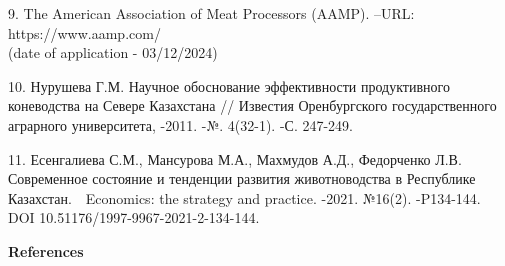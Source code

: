 \begin{noparindent}
9. The American Association of Meat Processors (AAMP). --URL:
https://www.aamp.com/ \\(date of application - 03/12/2024)

10. Нурушева Г.М. Научное обоснование эффективности продуктивного
коневодства на Севере Казахстана // Известия Оренбургского
государственного аграрного университета, -2011. -№. 4(32-1). -С.
247-249.

11. Есенгалиева С.М., Мансурова М.А., Махмудов А.Д., Федорченко Л.В.
Современное состояние и тенденции развития животноводства в Республике
Казахстан.~~Economics: the strategy and practice. -2021. №16(2).
-P134-144. DOI 10.51176/1997-9967-2021-2-134-144.

\end{noparindent}

\begin{center}
{\bfseries References}
\end{center}

